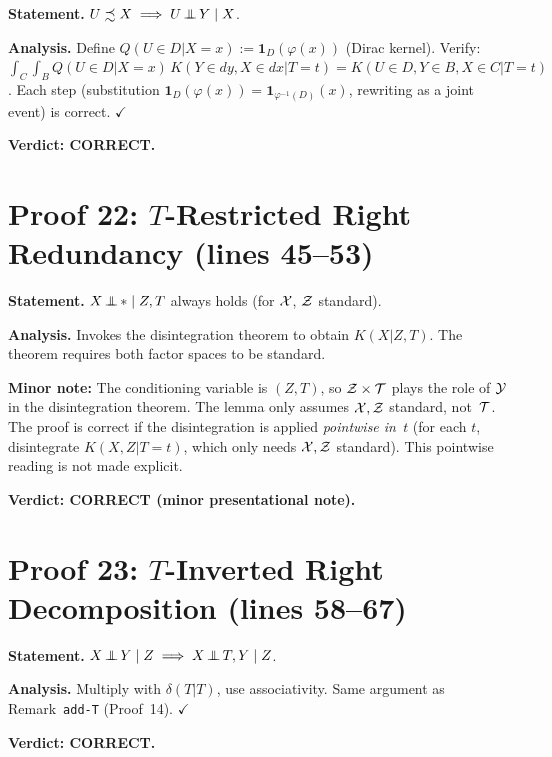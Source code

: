 \documentclass{article}
\begin{document}
\textbf{Statement.} $U\precsim X \implies U\operatorname*{\perp\mkern-11mu\perp} Y\mid X$.

\textbf{Analysis.}
Define $Q(U\in D|X=x):=\mathbf{1}_D(\varphi(x))$ (Dirac kernel).
Verify: $\int_C\int_B Q(U\in D|X=x)\,K(Y\in dy,X\in dx|T=t)
= K(U\in D,Y\in B,X\in C|T=t)$.
Each step (substitution $\mathbf{1}_D(\varphi(x))=\mathbf{1}_{\varphi^{-1}(D)}(x)$,
rewriting as a joint event) is correct.  $\checkmark$

\textbf{Verdict: CORRECT.}

\section{Proof 22: $T$-Restricted Right Redundancy (lines 45--53)}

\textbf{Statement.} $X\operatorname*{\perp\mkern-11mu\perp} *\mid Z,T$ always holds (for $\mathcal{X}$, $\mathcal{Z}$ standard).

\textbf{Analysis.}
Invokes the disintegration theorem to obtain $K(X|Z,T)$.
The theorem requires both factor spaces to be standard.

\textbf{Minor note:} The conditioning variable is $(Z,T)$, so
$\mathcal{Z}\times\mathcal{T}$ plays the role of $\mathcal{Y}$ in the disintegration theorem.
The lemma only assumes $\mathcal{X},\mathcal{Z}$ standard, not~$\mathcal{T}$.
The proof is correct if the disintegration is applied \emph{pointwise in~$t$}
(for each $t$, disintegrate $K(X,Z|T=t)$, which only needs $\mathcal{X},\mathcal{Z}$ standard).
This pointwise reading is not made explicit.

\textbf{Verdict: CORRECT (minor presentational note).}

\section{Proof 23: $T$-Inverted Right Decomposition (lines 58--67)}

\textbf{Statement.} $X\operatorname*{\perp\mkern-11mu\perp} Y\mid Z \implies X\operatorname*{\perp\mkern-11mu\perp} T,Y\mid Z$.

\textbf{Analysis.}
Multiply with $\delta(T|T)$, use associativity.
Same argument as Remark~\texttt{add-T} (Proof~14).  $\checkmark$

\textbf{Verdict: CORRECT.}

\end{document}
